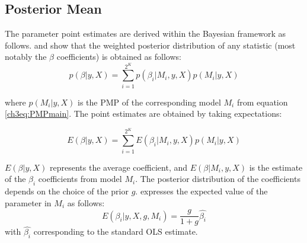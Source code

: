 \begin{refsection}
\begin{subappendices}
    \subsection*{Posterior Mean}
    The parameter point estimates are derived within the Bayesian framework as follows. \textcite{Zeugner2011} and \textcite{MoralBenito2012} show that the weighted posterior distribution of any statistic (most notably the $\beta$ coefficients) is obtained as follows:
    \begin{equation}\label{ch3eq:parest}
    p(\beta \vert y, X) = \sum_{i=1}^{2^{K}} p(\beta_{i} \vert M_{i},y,X)p(M_{i} \vert y,X)
    \end{equation}
    
    where $p(M_{i} \vert y, X)$ is the \ac{PMP} of the corresponding model $M_{i}$ from equation \ref{ch3eq:PMPmain}. The point estimates are obtained by taking expectations:
    
    \begin{equation}\label{ch3eq:pointparest}
    E(\beta \vert y, X) = \sum_{i=1}^{2^{K}} E(\beta_{i} \vert M_{i},y,X)p(M_{i} \vert y,X)
    \end{equation}
    
    $E(\beta \vert y, X)$ represents the average coefficient, and $E(\beta \vert M_{i},y,X)$ is the estimate of the $\beta_{i}$ coefficients from model $M_{i}$. The posterior distribution of the coefficients depends on the choice of the prior $g$. \textcite{Zeugner2011} expresses the expected value of the parameter in $M_{i}$ as follows:
    \begin{equation}\label{ch3eq:postdist}
    E(\beta_{i} \vert y,X,g,M_{i}) = \frac{g}{1+g}\hat{\beta_{i}}
    \end{equation}
    with $\hat{\beta_{i}}$ corresponding to the standard OLS estimate.
    

\end{subappendices}
\end{refsection}

